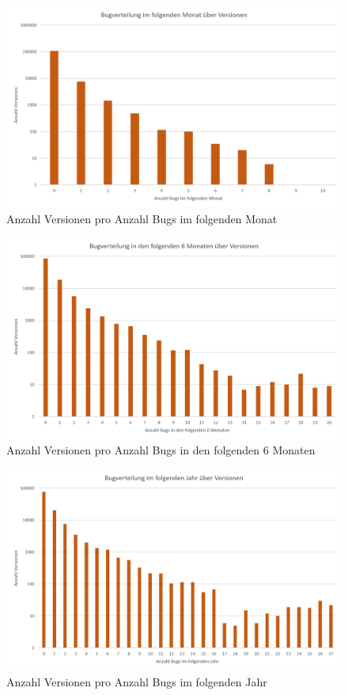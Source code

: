 \documentclass[10pt, a4paper]{article}
\begin{document}
\begin{figure}[!ht]
	\centering
	\includegraphics[width=1\textwidth]{resources/images/chart_bug_distribution_1month.png}
	\caption{Anzahl Versionen pro Anzahl Bugs im folgenden Monat}
	\label{fig:versionbugdist_1month}
\end{figure}

\begin{figure}[!ht]
	\centering
	\includegraphics[width=1\textwidth]{resources/images/chart_bug_distribution_6month.png}
	\caption{Anzahl Versionen pro Anzahl Bugs in den folgenden 6 Monaten}
	\label{fig:versionbugdist_6month}
\end{figure}

\begin{figure}[!ht]
	\centering
	\includegraphics[width=1\textwidth]{resources/images/chart_bug_distribution_1year.png}
	\caption{Anzahl Versionen pro Anzahl Bugs im folgenden Jahr}
	\label{fig:versionbugdist_1year}
\end{figure}
\end{document}
